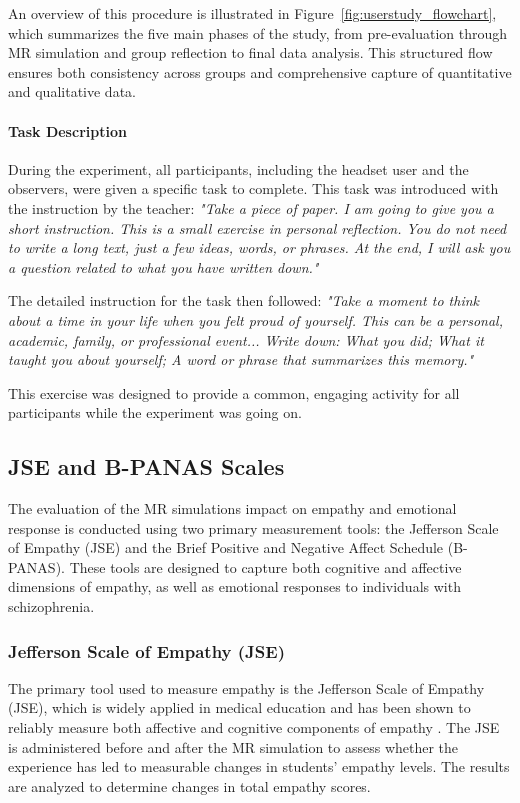 An overview of this procedure is illustrated in Figure~\ref{fig:userstudy_flowchart}, which summarizes the five main phases of the study, from pre-evaluation through MR simulation and group reflection to final data analysis. This structured flow ensures both consistency across groups and comprehensive capture of quantitative and qualitative data.

\paragraph{Task Description}
During the experiment, all participants, including the headset user and the observers, were given a specific task to complete. This task was introduced with the instruction by the teacher: \textit{"Take a piece of paper. I am going to give you a short instruction. This is a small exercise in personal reflection. You do not need to write a long text, just a few ideas, words, or phrases. At the end, I will ask you a question related to what you have written down."}

The detailed instruction for the task then followed: \textit{"Take a moment to think about a time in your life when you felt proud of yourself. This can be a personal, academic, family, or professional event... Write down: What you did; What it taught you about yourself; A word or phrase that summarizes this memory."} 

This exercise was designed to provide a common, engaging activity for all participants while the experiment was going on.

\subsection{JSE and B-PANAS Scales}
\label{ch:eval}
The evaluation of the MR simulations impact on empathy and emotional response is conducted using two primary measurement tools: the Jefferson Scale of Empathy (JSE) and the Brief Positive and Negative Affect Schedule (B-PANAS). These tools are designed to capture both cognitive and affective dimensions of empathy, as well as emotional responses to individuals with schizophrenia.

\subsubsection{Jefferson Scale of Empathy (JSE)}
\label{sec:jse}

The primary tool used to measure empathy is the Jefferson Scale of Empathy (JSE), which is widely applied in medical education and has been shown to reliably measure both affective and cognitive components of empathy \cite{Hojat2002}. The JSE is administered before and after the MR simulation to assess whether the experience has led to measurable changes in students’ empathy levels. The results are analyzed to determine changes in total empathy scores.

